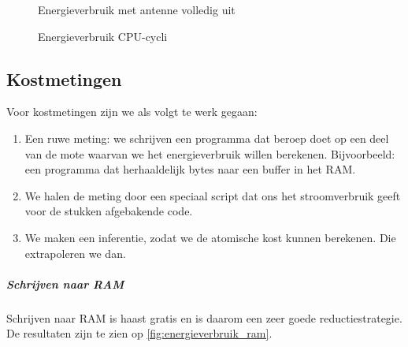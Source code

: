 \documentclass[11pt]{article}
\begin{document}
\begin{figure}[h]
\centering
\caption{Energieverbruik met antenne volledig uit}
\label{fig:energieverbruik_antenne_uit}
\end{figure}

\begin{figure}[h]
\centering

\caption{Energieverbruik CPU-cycli}
\label{fig:energieverbruik_cpu}
\end{figure}

\subsection{Kostmetingen}

Voor kostmetingen zijn we als volgt te werk gegaan:

\begin{enumerate}
\item Een ruwe meting: we schrijven een programma dat beroep doet op een deel
van de mote waarvan we het energieverbruik willen berekenen. Bijvoorbeeld: een
programma dat herhaaldelijk bytes naar een buffer in het RAM. 
\item We halen de meting door een speciaal script dat ons het stroomverbruik geeft voor de stukken afgebakende code.
\item We maken een inferentie, zodat we de atomische kost kunnen berekenen. Die extrapoleren we dan.
\end{enumerate}

\subparagraph{Schrijven naar RAM}

Schrijven naar RAM is haast gratis en is daarom een zeer goede
reductiestrategie. De resultaten zijn te zien op \ref{fig:energieverbruik_ram}.
\end{document}
